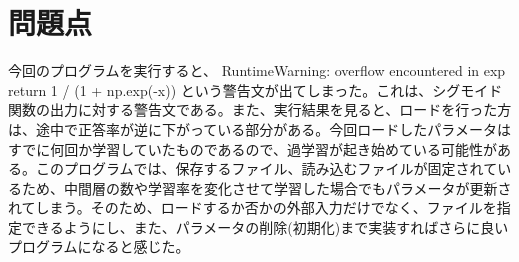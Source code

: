 \documentclass[11px,a4,dvipdfmx]{jsarticle}
\begin{document}
\section{問題点}
今回のプログラムを実行すると、 RuntimeWarning: overflow encountered in exp return 1 / (1 + np.exp(-x)) という警告文が出てしまった。これは、シグモイド関数の出力に対する警告文である。また、実行結果を見ると、ロードを行った方は、途中で正答率が逆に下がっている部分がある。今回ロードしたパラメータはすでに何回か学習していたものであるので、過学習が起き始めている可能性がある。このプログラムでは、保存するファイル、読み込むファイルが固定されているため、中間層の数や学習率を変化させて学習した場合でもパラメータが更新されてしまう。そのため、ロードするか否かの外部入力だけでなく、ファイルを指定できるようにし、また、パラメータの削除(初期化)まで実装すればさらに良いプログラムになると感じた。
\end{document}
